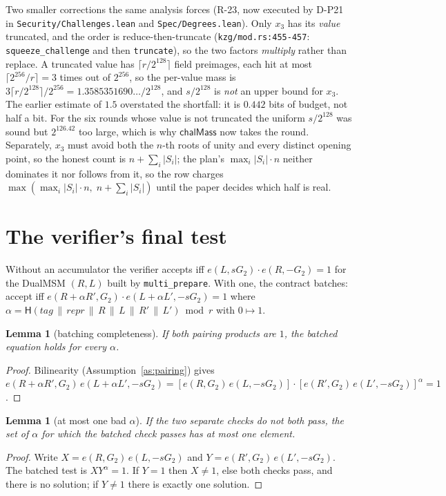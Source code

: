 \documentclass[11pt]{article}
\newtheorem{lemma}[theorem]{Lemma}
\newcommand{\Hash}{\mathsf{H}}
\begin{document}
Two smaller corrections the same analysis forces (R-23, now executed by D-P21 in
\texttt{Security/Challenges.lean} and \texttt{Spec/Degrees.lean}). Only $x_3$ has
its \emph{value} truncated, and the order is reduce-then-truncate
(\texttt{kzg/mod.rs:455-457}: \texttt{squeeze\_challenge} and then
\texttt{truncate}), so the two factors \emph{multiply} rather than replace. A
truncated value has $\lceil r/2^{128}\rceil$ field preimages, each hit at most
$\lceil 2^{256}/r\rceil = 3$ times out of $2^{256}$, so the per-value mass is
$3\lceil r/2^{128}\rceil/2^{256} = 1.3585351690\ldots/2^{128}$, and $s/2^{128}$
is \emph{not} an upper bound for $x_3$. The earlier estimate of $1.5$ overstated
the shortfall: it is $0.442$ bits of budget, not half a bit. For the six rounds
whose value is not truncated the uniform $s/2^{128}$ was sound but $2^{126.42}$
too large, which is why $\mathsf{chalMass}$ now takes the round. Separately,
$x_3$ must avoid both the $n$-th roots of unity and every distinct opening point,
so the honest count is $n + \sum_i |S_i|$; the plan's $\max_i |S_i| \cdot n$
neither dominates it nor follows from it, so the row charges
$\max(\max_i |S_i| \cdot n,\; n + \sum_i |S_i|)$ until the paper decides which
half is real.

\section{The verifier's final test}

Without an accumulator the verifier accepts iff
$e(L, sG_2)\cdot e(R, -G_2) = 1$ for the DualMSM $(R,L)$ built by
\texttt{multi\_prepare}. With one, the contract batches: accept iff
$e(R+\alpha R', G_2)\cdot e(L+\alpha L', -sG_2) = 1$ where
$\alpha = \Hash(\mathit{tag} \,\|\, \mathit{repr} \,\|\, R \,\|\, L
\,\|\, R' \,\|\, L') \bmod r$ with $0 \mapsto 1$.

\begin{lemma}[batching completeness]\label{le:batchcomp}
If both pairing products are $1$, the batched equation holds for every $\alpha$.
\end{lemma}
\begin{proof}
Bilinearity (Assumption~\ref{as:pairing}) gives
$e(R+\alpha R',G_2)\,e(L+\alpha L',-sG_2) =
[e(R,G_2)\,e(L,-sG_2)]\cdot[e(R',G_2)\,e(L',-sG_2)]^{\alpha} = 1$.
\end{proof}

\begin{lemma}[at most one bad $\alpha$]\label{le:batchroot}
If the two separate checks do not both pass, the set of $\alpha$ for which the
batched check passes has at most one element.
\end{lemma}
\begin{proof}
Write $X = e(R,G_2)\,e(L,-sG_2)$ and $Y = e(R',G_2)\,e(L',-sG_2)$. The batched
test is $X Y^{\alpha} = 1$. If $Y = 1$ then $X \ne 1$, else both checks pass, and
there is no solution; if $Y \ne 1$ there is exactly one solution.
\end{proof}
\end{document}
